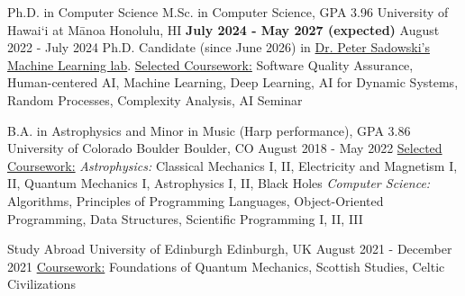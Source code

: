 \begin{cventries}
\vspace{1mm}

	\cventry
	{Ph.D. in Computer Science
        \newline M.Sc. in Computer Science, GPA 3.96}
	{University of Hawai`i at Mānoa}
	{Honolulu, HI}
	{\textbf{July 2024 - May 2027 (expected)}
        \newline August 2022 - July 2024}
	{
        Ph.D. Candidate (since June 2026) in \href{https://peterjsadowski.github.io/}{Dr. Peter Sadowski's Machine Learning lab}. \underline{Selected Coursework:} Software Quality Assurance, Human-centered AI, Machine Learning, Deep Learning, AI for Dynamic Systems, Random Processes, Complexity Analysis, AI Seminar
	}

	\vspace{2mm}

	\cventry
	{B.A. in Astrophysics and Minor in Music (Harp performance), GPA 3.86}
	{University of Colorado Boulder}
	{Boulder, CO}
	{August 2018 - May 2022}
	{
	\underline{Selected Coursework:}
        \textit{Astrophysics:} Classical Mechanics I, II, Electricity and Magnetism I, II, Quantum Mechanics I, Astrophysics I, II, Black Holes
        \textit{Computer Science:} Algorithms, Principles of Programming Languages, Object-Oriented Programming, Data Structures, Scientific Programming I, II, III
	}

	\vspace{2mm}

	\cventry
	{Study Abroad}
	{University of Edinburgh}
	{Edinburgh, UK}
	{August 2021 - December 2021}
        {
        \underline{Coursework:} Foundations of Quantum Mechanics, Scottish Studies, Celtic Civilizations
        }

\vspace{-2mm}

\end{cventries}
